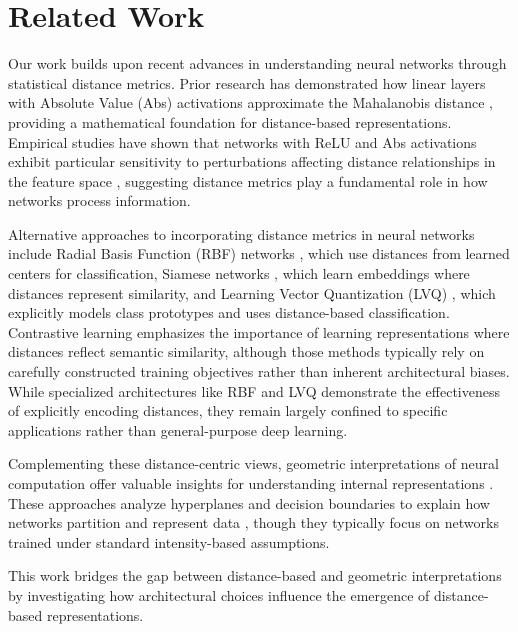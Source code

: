 \section{Related Work}
\label{sec:related_work}
Our work builds upon recent advances in understanding neural networks through statistical distance metrics. Prior research has demonstrated how linear layers with Absolute Value (Abs) activations approximate the Mahalanobis distance \cite{mahalanobis1936generalized, oursland2024interpreting}, providing a mathematical foundation for distance-based representations. Empirical studies have shown that networks with ReLU and Abs activations exhibit particular sensitivity to perturbations affecting distance relationships in the feature space \cite{oursland2024neural}, suggesting distance metrics play a fundamental role in how networks process information.

Alternative approaches to incorporating distance metrics in neural networks include Radial Basis Function (RBF) networks \cite{broomhead1988radial, park1991universal}, which use distances from learned centers for classification, Siamese networks \cite{bromley1994signature, hadsell2006dimensionality}, which learn embeddings where distances represent similarity, and Learning Vector Quantization (LVQ) \cite{kohonen1995learning}, which explicitly models class prototypes and uses distance-based classification. Contrastive learning \cite{chen2020simple, he2020momentum} emphasizes the importance of learning representations where distances reflect semantic similarity, although those methods typically rely on carefully constructed training objectives rather than inherent architectural biases. While specialized architectures like RBF and LVQ demonstrate the effectiveness of explicitly encoding distances, they remain largely confined to specific applications rather than general-purpose deep learning. 

Complementing these distance-centric views, geometric interpretations of neural computation offer valuable insights for understanding internal representations \cite{montavon2018methods, olah2017feature}. These approaches analyze hyperplanes and decision boundaries to explain how networks partition and represent data \cite{lipton2018mythos, erhan2009visualizing}, though they typically focus on networks trained under standard intensity-based assumptions. 

This work bridges the gap between distance-based and geometric interpretations by investigating how architectural choices influence the emergence of distance-based representations.
